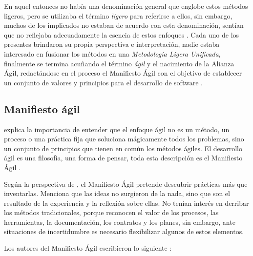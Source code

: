   En aquel entonces no había una denominación general que englobe estos métodos ligeros, pero se utilizaba el término \textit{ligero} para referirse a ellos, sin embargo, muchos de los implicados no estaban de acuerdo con esta denominación, sentían que no reflejaba adecuadamente la esencia de estos enfoques \parencite{fowler:2005,cockburn:2002}. Cada uno de los presentes brindaron su propia perspectiva e interpretación, nadie estaba interesado en fusionar los métodos en una \textit{Metodología Ligera Unificada}, finalmente se termina acuñando el término \textit{ágil} y el nacimiento de la Alianza Ágil, redactándose en el proceso el Manifiesto Ágil con el objetivo de establecer un conjunto de valores y principios para el desarrollo de software \parencite{cockburn:2002}.

  \subsection{Manifiesto ágil}
  \textcite{verheyen:2019} explica la importancia de entender que el enfoque ágil no es un método, un proceso o una práctica fija que soluciona mágicamente todos los problemas, sino un conjunto de principios que tienen en común los métodos ágiles. El desarrollo ágil es una filosofía, una forma de pensar, toda esta descripción es el Manifiesto Ágil \parencite{shore:2008}.

  Según la perspectiva de \textcite{cockburn:2002}, el Manifiesto Ágil pretende descubrir prácticas más que inventarlas. Menciona que las ideas no surgieron de la nada, sino que son el resultado de la experiencia y la reflexión sobre ellas. No tenían interés en derribar los métodos tradicionales, porque reconocen el valor de los procesos, las herramientas, la documentación, los contratos y los planes, sin embargo, ante situaciones de incertidumbre es necesario flexibilizar algunos de estos elementos.

  Los autores del Manifiesto Ágil escribieron lo siguiente \parencite{manifesto:2001}:

